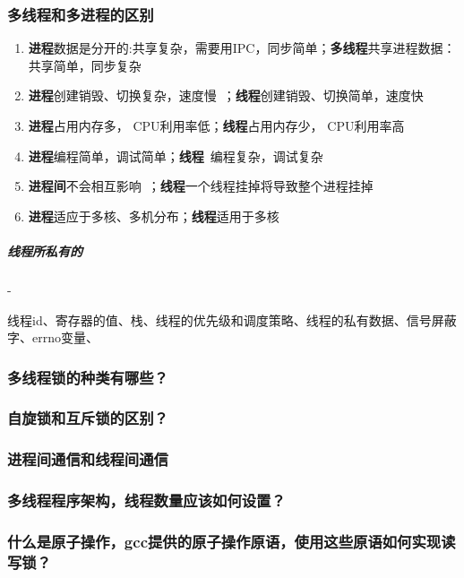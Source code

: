 \documentclass[UTF8,a4paper,8pt]{ctexart}
\begin{document}
		\subsubsection{多线程和多进程的区别}
			\begin{enumerate}
				\item \textbf{进程}数据是分开的:共享复杂，需要用IPC，同步简单；\textbf{多线程}共享进程数据：共享简单，同步复杂
				\item \textbf{进程}创建销毁、切换复杂，速度慢 ；\textbf{线程}创建销毁、切换简单，速度快 
				\item \textbf{进程}占用内存多， CPU利用率低；\textbf{线程}占用内存少， CPU利用率高
				\item \textbf{进程}编程简单，调试简单；\textbf{线程} 编程复杂，调试复杂
				\item \textbf{进程间}不会相互影响 ；\textbf{线程}一个线程挂掉将导致整个进程挂掉
				\item \textbf{进程}适应于多核、多机分布；\textbf{线程}适用于多核
			\end{enumerate}
		
			\subparagraph{线程所私有的}-
			
			线程id、寄存器的值、栈、线程的优先级和调度策略、线程的私有数据、信号屏蔽字、errno变量、
		\subsubsection{多线程锁的种类有哪些？}
		
		\subsubsection{自旋锁和互斥锁的区别？}
		
		\subsubsection{进程间通信和线程间通信}
		
		\subsubsection{多线程程序架构，线程数量应该如何设置？}
		
		\subsubsection{什么是原子操作，gcc提供的原子操作原语，使用这些原语如何实现读写锁？}
		
\end{document}
